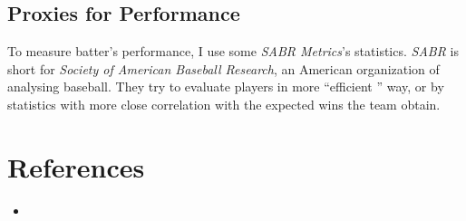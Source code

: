 \documentclass[dvipdfmx, 12pt]{article}
\begin{document}
\subsection{Proxies for Performance}

To measure batter's performance, I use some \textit{SABR
Metrics}'s statistics. \textit{SABR} is short for \textit{Society
of American Baseball Research}, an American organization of
analysing baseball. They try to evaluate players in more ``efficient ''
way,  or by statistics with more close correlation with the
expected wins the team obtain.

\section{References}
\small
\begin{itemize}
  \item
\end{itemize}
\end{document}
